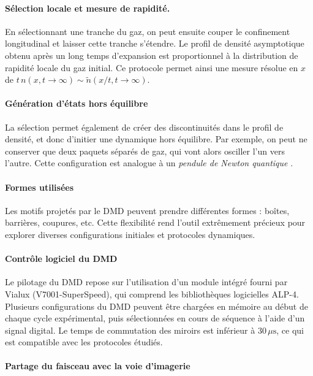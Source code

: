 \paragraph{Sélection locale et mesure de rapidité.}

En sélectionnant une tranche du gaz, on peut ensuite couper le confinement longitudinal et laisser cette tranche s’étendre. Le profil de densité asymptotique obtenu après un long temps d’expansion est proportionnel à la distribution de rapidité locale du gaz initial. Ce protocole permet ainsi une mesure résolue en $x$ de \(t\, n(x,t \to \infty) \sim \tilde{n}(x/t, t \to \infty)\).

\paragraph{Génération d’états hors équilibre}

La sélection permet également de créer des discontinuités dans le profil de densité, et donc d’initier une dynamique hors équilibre. Par exemple, on peut ne conserver que deux paquets séparés de gaz, qui vont alors osciller l’un vers l’autre. Cette configuration est analogue à un \emph{pendule de Newton quantique} \cite{10.21468/SciPostPhys.6.6.070,Kinoshita}.

\paragraph{Formes utilisées}

Les motifs projetés par le \gls*{DMD} peuvent prendre différentes formes : boîtes, barrières, coupures, etc. Cette flexibilité rend l’outil extrêmement précieux pour explorer diverses configurations initiales et protocoles dynamiques.

\paragraph{Contrôle logiciel du DMD}

Le pilotage du \gls*{DMD} repose sur l’utilisation d’un module intégré fourni par Vialux (V7001-SuperSpeed), qui comprend les bibliothèques logicielles ALP-4. Plusieurs configurations du DMD peuvent être chargées en mémoire au début de chaque cycle expérimental, puis sélectionnées en cours de séquence à l’aide d’un signal digital. Le temps de commutation des miroirs est inférieur à \(30\,\mu\mathrm{s}\), ce qui est compatible avec les protocoles étudiés.

\paragraph{Partage du faisceau avec la voie d’imagerie}


